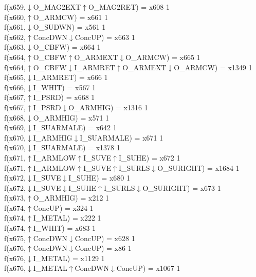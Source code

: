 f(x659,$\downarrow$O\_MAG2EXT$\uparrow$O\_MAG2RET) = x608 {1} \\
f(x660,$\uparrow$O\_ARMCW) = x661 {1} \\
f(x661,$\downarrow$O\_SUDWN) = x561 {1} \\
f(x662,$\uparrow$ConcDWN$\downarrow$ConcUP) = x663 {1} \\
f(x663,$\downarrow$O\_CBFW) = x664 {1} \\
f(x664,$\uparrow$O\_CBFW$\uparrow$O\_ARMEXT$\downarrow$O\_ARMCW) = x665 {1} \\
f(x664,$\uparrow$O\_CBFW$\downarrow$I\_ARMRET$\uparrow$O\_ARMEXT$\downarrow$O\_ARMCW) = x1349 {1} \\
f(x665,$\downarrow$I\_ARMRET) = x666 {1} \\
f(x666,$\downarrow$I\_WHIT) = x567 {1} \\
f(x667,$\uparrow$I\_PSRD) = x668 {1} \\
f(x667,$\uparrow$I\_PSRD$\downarrow$O\_ARMHIG) = x1316 {1} \\
f(x668,$\downarrow$O\_ARMHIG) = x571 {1} \\
f(x669,$\downarrow$I\_SUARMALE) = x642 {1} \\
f(x670,$\downarrow$I\_ARMHIG$\downarrow$I\_SUARMALE) = x671 {1} \\
f(x670,$\downarrow$I\_SUARMALE) = x1378 {1} \\
f(x671,$\uparrow$I\_ARMLOW$\uparrow$I\_SUVE$\uparrow$I\_SUHE) = x672 {1} \\
f(x671,$\uparrow$I\_ARMLOW$\uparrow$I\_SUVE$\uparrow$I\_SURLS$\downarrow$O\_SURIGHT) = x1684 {1} \\
f(x672,$\downarrow$I\_SUVE$\downarrow$I\_SUHE) = x680 {1} \\
f(x672,$\downarrow$I\_SUVE$\downarrow$I\_SUHE$\uparrow$I\_SURLS$\downarrow$O\_SURIGHT) = x673 {1} \\
f(x673,$\uparrow$O\_ARMHIG) = x212 {1} \\
f(x674,$\uparrow$ConcUP) = x324 {1} \\
f(x674,$\uparrow$I\_METAL) = x222 {1} \\
f(x674,$\uparrow$I\_WHIT) = x683 {1} \\
f(x675,$\uparrow$ConcDWN$\downarrow$ConcUP) = x628 {1} \\
f(x676,$\uparrow$ConcDWN$\downarrow$ConcUP) = x86 {1} \\
f(x676,$\downarrow$I\_METAL) = x1129 {1} \\
f(x676,$\downarrow$I\_METAL$\uparrow$ConcDWN$\downarrow$ConcUP) = x1067 {1} \\
